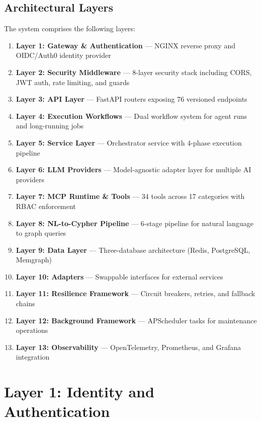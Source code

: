 \documentclass[a4paper,twoside]{sapthesis}
\begin{document}
\subsection{Architectural Layers}
\label{subsec:arch-layers}

The system comprises the following layers:

\begin{enumerate}
    \item \textbf{Layer 1: Gateway \& Authentication} --- NGINX reverse proxy and OIDC/Auth0 identity provider
    \item \textbf{Layer 2: Security Middleware} --- 8-layer security stack including CORS, JWT auth, rate limiting, and guards
    \item \textbf{Layer 3: API Layer} --- FastAPI routers exposing 76 versioned endpoints
    \item \textbf{Layer 4: Execution Workflows} --- Dual workflow system for agent runs and long-running jobs
    \item \textbf{Layer 5: Service Layer} --- Orchestrator service with 4-phase execution pipeline
    \item \textbf{Layer 6: LLM Providers} --- Model-agnostic adapter layer for multiple AI providers
    \item \textbf{Layer 7: MCP Runtime \& Tools} --- 34 tools across 17 categories with RBAC enforcement
    \item \textbf{Layer 8: NL-to-Cypher Pipeline} --- 6-stage pipeline for natural language to graph queries
    \item \textbf{Layer 9: Data Layer} --- Three-database architecture (Redis, PostgreSQL, Memgraph)
    \item \textbf{Layer 10: Adapters} --- Swappable interfaces for external services
    \item \textbf{Layer 11: Resilience Framework} --- Circuit breakers, retries, and fallback chains
    \item \textbf{Layer 12: Background Framework} --- APScheduler tasks for maintenance operations
    \item \textbf{Layer 13: Observability} --- OpenTelemetry, Prometheus, and Grafana integration
\end{enumerate}

\section{Layer 1: Identity and Authentication}
\label{sec:layer1-auth}
\end{document}
